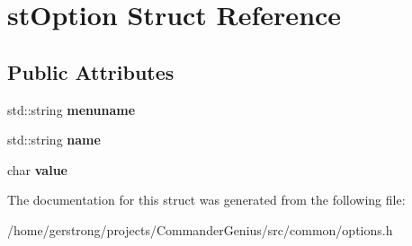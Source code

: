\hypertarget{structst_option}{
\section{stOption Struct Reference}
\label{structst_option}
}
\subsection*{Public Attributes}
\begin{DoxyCompactItemize}
\item 
\hypertarget{structst_option_a7b54149df1a75ff4694f82e2866687cf}{
std::string {\bfseries menuname}}
\label{structst_option_a7b54149df1a75ff4694f82e2866687cf}

\item 
\hypertarget{structst_option_a86e8beed93a190d1d6ea9625a13afab3}{
std::string {\bfseries name}}
\label{structst_option_a86e8beed93a190d1d6ea9625a13afab3}

\item 
\hypertarget{structst_option_a94133e8cf65e18c37e460fcaf9ce8f9f}{
char {\bfseries value}}
\label{structst_option_a94133e8cf65e18c37e460fcaf9ce8f9f}

\end{DoxyCompactItemize}


The documentation for this struct was generated from the following file:\begin{DoxyCompactItemize}
\item 
/home/gerstrong/projects/CommanderGenius/src/common/options.h\end{DoxyCompactItemize}
